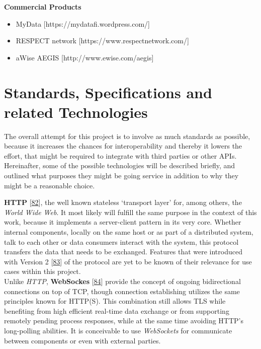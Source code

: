 \documentclass[12pt,english,a4paper,titlepage,cleardoublepage=empty,dottedtoc]{report}
\providecommand{\tightlist}{%
  \setlength{\itemsep}{0pt}\setlength{\parskip}{0pt}}
\begin{document}
\textbf{Commercial Products}

\begin{itemize}
\tightlist
\item
  MyData {[}https://mydatafi.wordpress.com/{]}
\item
  RESPECT network {[}https://www.respectnetwork.com/{]}
\item
  aWise AEGIS {[}http://www.ewise.com/aegis{]}
\end{itemize}

\hypertarget{standards-specifications-and-related-technologies}{\section{Standards,
Specifications and related
Technologies}\label{standards-specifications-and-related-technologies}}

The overall attempt for this project is to involve as much standards as
possible, because it increases the chances for interoperability and
thereby it lowers the effort, that might be required to integrate with
third parties or other APIs. Hereinafter, some of the possible
technologies will be described briefly, and outlined what purposes they
might be going service in addition to why they might be a reasonable
choice.

\textbf{\protect\hypertarget{link_http}{}{HTTP}}
{[}\protect\hyperlink{ref-web_spec_http1}{82}{]}, the well known
stateless `transport layer' for, among others, the \emph{World Wide
Web}. It most likely will fulfill the same purpose in the context of
this work, because it implements a server-client pattern in its very
core. Whether internal components, locally on the same host or as part
of a distributed system, talk to each other or data consumers interact
with the system, this protocol transfers the data that needs to be
exchanged. Features that were introduced with Version 2
{[}\protect\hyperlink{ref-web_spec_http2}{83}{]} of the protocol are yet
to be known of their relevance for use cases within this project.\\
Unlike \emph{HTTP}, \textbf{WebSockes}
{[}\protect\hyperlink{ref-web_spec_websockets}{84}{]} provide the
concept of ongoing bidirectional connections on top of TCP, though
connection establishing utilizes the same principles known for HTTP(S).
This combination still allows TLS while benefiting from high efficient
real-time data exchange or from supporting remotely pending process
responses, while at the same time avoiding HTTP's long-polling
abilities. It is conceivable to use \emph{WebSockets} for communicate
between components or even with external parties.
\end{document}
